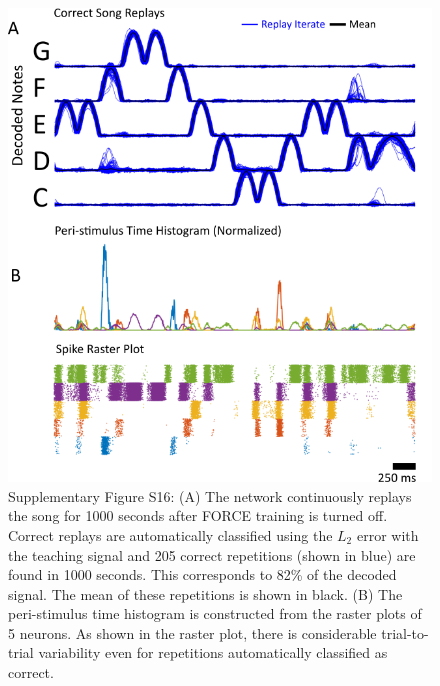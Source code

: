 \documentclass[11pt]{article} %
\begin{document}
%

\begin{figure}[htp!]
\centering
\includegraphics[scale=0.95]{FFIGS17}
\caption*{Supplementary Figure S16:  (A) The network continuously replays the song for 1000 seconds after FORCE training is turned off.    Correct replays are automatically classified using the $L_2$ error with the teaching signal and 205 correct repetitions (shown in blue) are found in 1000 seconds.  This corresponds to 82\% of the decoded signal.  The mean of these repetitions is shown in black.  (B) The peri-stimulus time histogram is constructed from the raster plots of 5 neurons.  As shown in the raster plot, there is considerable trial-to-trial variability even for repetitions automatically classified as correct.} 
\end{figure}
\end{document}
